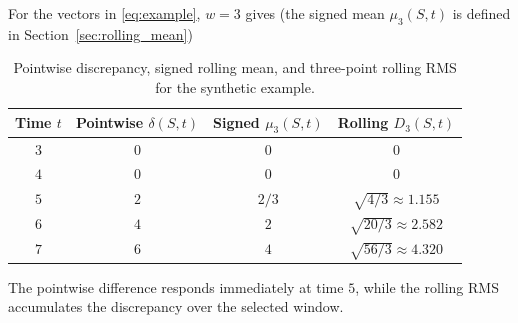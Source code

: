 \documentclass[10pt,letterpaper]{article}
\begin{document}
For the vectors in \eqref{eq:example}, $w=3$ gives
(the signed mean $\mu_3(S,t)$ is defined in
Section~\ref{sec:rolling_mean})
\begin{table}[t]
\centering\small
\begin{tabular}{@{}cccc@{}}
\toprule
Time $t$ & Pointwise $\delta(S,t)$ & Signed $\mu_3(S,t)$ & Rolling $D_3(S,t)$ \\
\midrule
$3$ & $0$ & $0$ & $0$ \\
$4$ & $0$ & $0$ & $0$ \\
$5$ & $2$ & $2/3$ & $\sqrt{4/3}\approx1.155$ \\
$6$ & $4$ & $2$ & $\sqrt{20/3}\approx2.582$ \\
$7$ & $6$ & $4$ & $\sqrt{56/3}\approx4.320$ \\
\bottomrule
\end{tabular}
\caption{Pointwise discrepancy, signed rolling mean, and three-point rolling RMS for the synthetic example.}
\label{tab:rolling}
\end{table}
The pointwise difference responds immediately at time $5$, while the
rolling RMS accumulates the discrepancy over the selected window.
\end{document}
